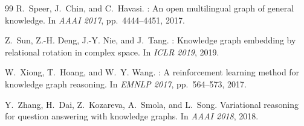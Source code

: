 \documentclass[11pt,a4paper]{article}
\begin{document}
\begin{thebibliography}{99}
R.~Speer, J.~Chin, and C.~Havasi.
: An open multilingual graph of general knowledge.
\newblock In \emph{AAAI 2017}, pp.~4444--4451, 2017.

Z.~Sun, Z.-H. Deng, J.-Y. Nie, and J.~Tang.
: Knowledge graph embedding by relational rotation in complex
  space.
\newblock In \emph{ICLR 2019}, 2019.

W.~Xiong, T.~Hoang, and W.~Y. Wang.
: A reinforcement learning method for knowledge graph
  reasoning.
\newblock In \emph{EMNLP 2017}, pp.~564--573, 2017.

Y.~Zhang, H.~Dai, Z.~Kozareva, A.~Smola, and L.~Song.
\newblock Variational reasoning for question answering with knowledge graphs.
\newblock In \emph{AAAI 2018}, 2018.

\end{thebibliography}
\end{document}
